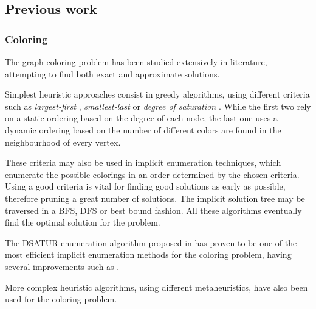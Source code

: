 \subsection{Previous work}

\subsubsection*{Coloring}

The graph coloring problem has been studied extensively in literature, attempting to find both exact and approximate solutions.

Simplest heuristic approaches consist in greedy algorithms, using different criteria such as \textit{largest-first} \cite{welsh1967upper}, \textit{smallest-last} \cite{matula1972graph} or \textit{degree of saturation} \cite{brelaz1979new}. While the first two rely on a static ordering based on the degree of each node, the last one uses a dynamic ordering based on the number of different colors are found in the neighbourhood of every vertex.

These criteria may also be used in implicit enumeration techniques, which enumerate the possible colorings in an order determined by the chosen criteria. Using a good criteria is vital for finding good solutions as early as possible, therefore pruning a great number of solutions. The implicit solution tree may be traversed in a BFS, DFS or best bound fashion. All these algorithms eventually find the optimal solution for the problem.

The DSATUR enumeration algorithm proposed in \cite{brelaz1979new} has proven to be one of the most efficient implicit enumeration methods for the coloring problem, having several improvements such as \cite{sewell1996improved}.

More complex heuristic algorithms, using different metaheuristics, have also been used for the coloring problem.

